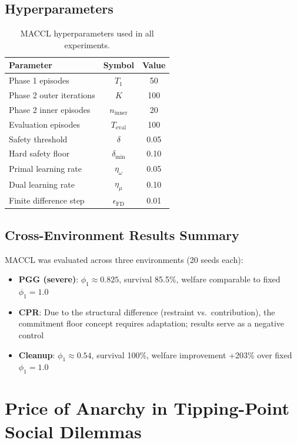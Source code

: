 \subsection{Hyperparameters}

\begin{table}[h]
\centering
\small
\caption{MACCL hyperparameters used in all experiments.}
\begin{tabular}{lcc}
\toprule
Parameter & Symbol & Value \\
\midrule
Phase 1 episodes & $T_1$ & 50 \\
Phase 2 outer iterations & $K$ & 100 \\
Phase 2 inner episodes & $n_{\mathrm{inner}}$ & 20 \\
Evaluation episodes & $T_{\mathrm{eval}}$ & 100 \\
Safety threshold & $\delta$ & 0.05 \\
Hard safety floor & $\delta_{\min}$ & 0.10 \\
Primal learning rate & $\eta_\omega$ & 0.05 \\
Dual learning rate & $\eta_\mu$ & 0.10 \\
Finite difference step & $\epsilon_{\mathrm{FD}}$ & 0.01 \\
\bottomrule
\end{tabular}
\end{table}

\subsection{Cross-Environment Results Summary}

MACCL was evaluated across three environments (20 seeds each):
\begin{itemize}
  \item \textbf{PGG (severe)}: $\phi_1 \approx 0.825$, survival 85.5\%, welfare comparable to fixed $\phi_1=1.0$
  \item \textbf{CPR}: Due to the structural difference (restraint vs.\ contribution), the commitment floor concept requires adaptation; results serve as a negative control
  \item \textbf{Cleanup}: $\phi_1 \approx 0.54$, survival 100\%, welfare improvement +203\% over fixed $\phi_1=1.0$
\end{itemize}


\section{Price of Anarchy in Tipping-Point Social Dilemmas}
\label{app:poa}


